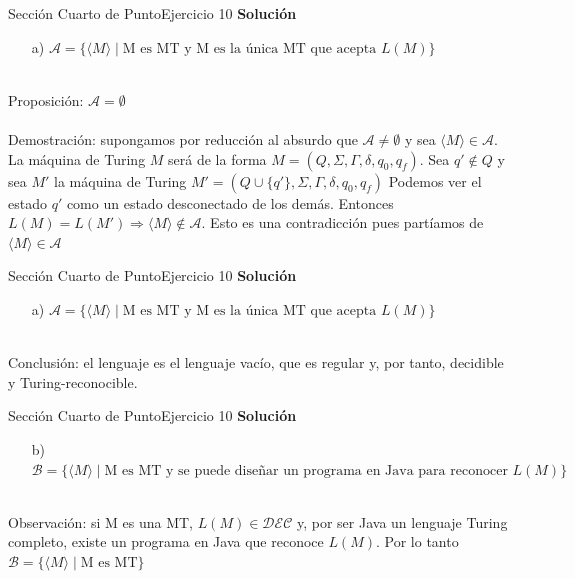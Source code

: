 \documentclass[10pt, envcountsect, presentation, aspectratio=169]{beamer}
\begin{document}
\begin{frame}{Sección Cuarto de Punto}{Ejercicio 10}
    \textbf{Solución}\\
    \begin{itemize}
        \item[a)] $\mathcal{A} = \{\langle M \rangle \mid \mbox{M es MT y  M es la única MT que acepta } L(M)\}$\\~\\
    \end{itemize}

    Proposición: $\mathcal{A} = \emptyset$\\~\\

    Demostración: supongamos por reducción al absurdo que $\mathcal{A} \neq \emptyset$ y sea $\langle M \rangle \in \mathcal{A}.$
    La máquina de Turing $M$ será de la forma $M=(Q,\Sigma,\Gamma,\delta,q_0,q_f)$. Sea $q' \notin Q$ y sea $M'$ la máquina de Turing $M'=(Q \cup \{q'\},\Sigma,\Gamma,\delta,q_0,q_f)$
    Podemos ver el estado $q'$ como un estado desconectado de los demás. Entonces $L(M) = L(M') \Rightarrow \langle M \rangle \notin \mathcal{A}$.
    Esto es una contradicción pues partíamos de $\langle M \rangle \in \mathcal{A}$   
\end{frame}


\begin{frame}{Sección Cuarto de Punto}{Ejercicio 10}
    \textbf{Solución}\\
    \begin{itemize}
        \item[a)] $\mathcal{A} = \{\langle M \rangle \mid \mbox{M es MT y  M es la única MT que acepta } L(M)\}$\\~\\
    \end{itemize}

    Conclusión: el lenguaje es el lenguaje vacío, que es regular y, por tanto, decidible y Turing-reconocible.
\end{frame}


\begin{frame}{Sección Cuarto de Punto}{Ejercicio 10}
    \textbf{Solución}\\
    \begin{itemize}
        \item[b)] $\mathcal{B} = \{\langle M \rangle \mid \mbox{M es MT  y  se puede diseñar un programa en Java para reconocer } L(M)\}$\\~\\
    \end{itemize}
    Observación: si M es una MT, $L(M) \in \mathcal{DEC}$ y, por ser Java un lenguaje Turing completo, existe un programa en Java que reconoce $L(M)$. Por lo tanto $\mathcal{B} = \{\langle M \rangle \mid \mbox{M es MT}\}$ \\~\\
    
\end{frame}
\end{document}
